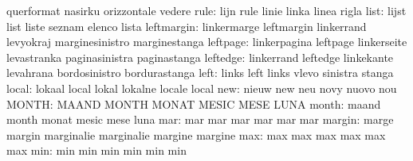                            querformat                nasirku
                           orizzontale               vedere
                     rule: lijn                      rule
                           linie                     linka
                           linea                     rigla
                     list: lijst                     list
                           liste                     seznam
                           elenco                    lista
               leftmargin: linkermarge               leftmargin
                           linkerrand                levyokraj
                           marginesinistro           marginestanga
                 leftpage: linkerpagina              leftpage
                           linkerseite               levastranka
                           paginasinistra            paginastanga
                 leftedge: linkerrand                leftedge
                           linkekante                levahrana
                           bordosinistro             bordurastanga
                     left: links                     left
                           links                     vlevo
                           sinistra                  stanga
                    local: lokaal                    local
                           lokal                     lokalne
                           locale                    local
                      new: nieuw                     new
                           neu                       novy
                           nuovo                     nou
                    MONTH: MAAND                     MONTH
                           MONAT                     MESIC
                           MESE                      LUNA
                    month: maand                     month
                           monat                     mesic
                           mese                      luna
                      mar: mar                       mar
                           mar                       mar
                           mar                       mar
                   margin: marge                     margin
                           marginalie                marginalie
                           margine                   margine
                      max: max                       max
                           max                       max
                           max                       max
                      min: min                       min
                           min                       min
                           min                       min
